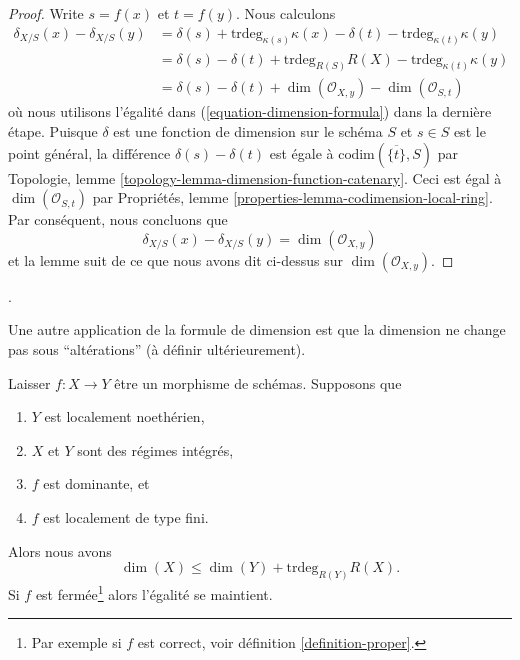 \begin{proof}
\medskip\noindent
Write $s = f(x)$ et $t = f(y)$. Nous calculons
\begin{align*}
\delta_{X/S}(x) - \delta_{X/S}(y)
& =
\delta(s) + \text{trdeg}_{\kappa(s)} \kappa(x)
- \delta(t) - \text{trdeg}_{\kappa(t)} \kappa(y) \\
& =
\delta(s) - \delta(t) +
\text{trdeg}_{R(S)} R(X) - \text{trdeg}_{\kappa(t)} \kappa(y) \\
& =
\delta(s) - \delta(t) + \dim(\mathcal{O}_{X, y})
- \dim(\mathcal{O}_{S, t})
\end{align*}
où nous utilisons l'égalité dans (\ref{equation-dimension-formula}) dans la dernière étape. Puisque $\delta$ est une fonction de dimension sur le schéma $S$ et $s \in S$ est le point général, la différence $\delta(s) - \delta(t)$ est égale à $\text{codim}(\overline{\{t\}}, S)$ par Topologie, lemme \ref{topology-lemma-dimension-function-catenary}. Ceci est égal à $\dim(\mathcal{O}_{S, t})$ par Propriétés, lemme \ref{properties-lemma-codimension-local-ring}. Par conséquent, nous concluons que $$
\delta_{X/S}(x) - \delta_{X/S}(y) = \dim(\mathcal{O}_{X, y})
$$ et la lemme suit de ce que nous avons dit ci-dessus sur $\dim(\mathcal{O}_{X, y})$.
\end{proof}
.

\noindent
Une autre application de la formule de dimension est que la dimension ne change pas sous ``altérations'' (à définir ultérieurement).

\begin{lemma}

\label{lemma-alteration-dimension}

Laisser $f : X \to Y$ être un morphisme de schémas. Supposons que

\begin{enumerate}

\item  $Y$ est localement noethérien,
\item  $X$ et $Y$ sont des régimes intégrés,
\item  $f$ est dominante, et
\item  $f$ est localement de type fini.

\end{enumerate}

Alors nous avons
$$
\dim(X) \leq \dim(Y) + \text{trdeg}_{R(Y)} R(X).
$$
Si $f$ est fermée\footnote{Par exemple si $f$ est correct, voir définition \ref{definition-proper}.} alors l'égalité se maintient.

\end{lemma}

